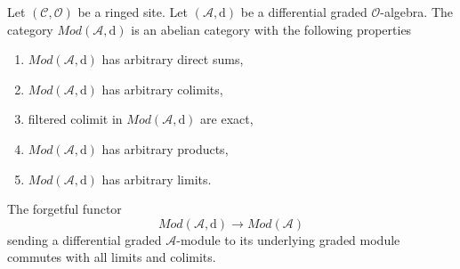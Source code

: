 \begin{lemma}
\label{lemma-dgm-abelian}
Let $(\mathcal{C}, \mathcal{O})$ be a ringed site.
Let $(\mathcal{A}, \text{d})$ be a differential graded $\mathcal{O}$-algebra.
The category $\textit{Mod}(\mathcal{A}, \text{d})$ is an abelian category
with the following properties
\begin{enumerate}
\item $\textit{Mod}(\mathcal{A}, \text{d})$ has arbitrary direct sums,
\item $\textit{Mod}(\mathcal{A}, \text{d})$ has arbitrary colimits,
\item filtered colimit in $\textit{Mod}(\mathcal{A}, \text{d})$ are exact,
\item $\textit{Mod}(\mathcal{A}, \text{d})$ has arbitrary products,
\item $\textit{Mod}(\mathcal{A}, \text{d})$ has arbitrary limits.
\end{enumerate}
The forgetful functor
$$
\textit{Mod}(\mathcal{A}, \text{d})
\longrightarrow
\textit{Mod}(\mathcal{A})
$$
sending a differential graded $\mathcal{A}$-module to its underlying
graded module commutes with all limits and colimits.
\end{lemma}

